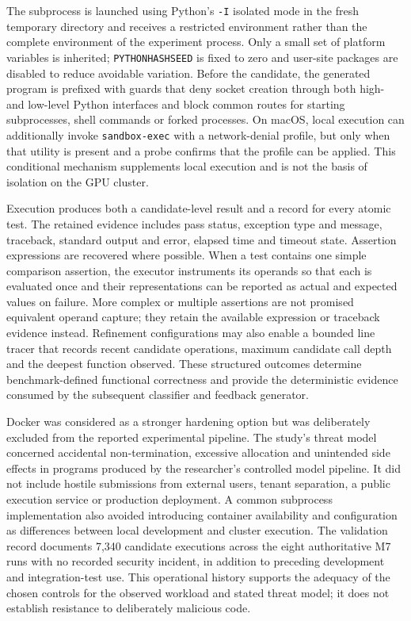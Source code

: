 The subprocess is launched using Python's \texttt{-I} isolated mode in the fresh temporary directory and receives a restricted environment rather than the complete environment of the experiment process. Only a small set of platform variables is inherited; \texttt{PYTHONHASHSEED} is fixed to zero and user-site packages are disabled to reduce avoidable variation. Before the candidate, the generated program is prefixed with guards that deny socket creation through both high- and low-level Python interfaces and block common routes for starting subprocesses, shell commands or forked processes. On macOS, local execution can additionally invoke \texttt{sandbox-exec} with a network-denial profile, but only when that utility is present and a probe confirms that the profile can be applied. This conditional mechanism supplements local execution and is not the basis of isolation on the GPU cluster.

Execution produces both a candidate-level result and a record for every atomic test. The retained evidence includes pass status, exception type and message, traceback, standard output and error, elapsed time and timeout state. Assertion expressions are recovered where possible. When a test contains one simple comparison assertion, the executor instruments its operands so that each is evaluated once and their representations can be reported as actual and expected values on failure. More complex or multiple assertions are not promised equivalent operand capture; they retain the available expression or traceback evidence instead. Refinement configurations may also enable a bounded line tracer that records recent candidate operations, maximum candidate call depth and the deepest function observed. These structured outcomes determine benchmark-defined functional correctness and provide the deterministic evidence consumed by the subsequent classifier and feedback generator.

Docker was considered as a stronger hardening option but was deliberately excluded from the reported experimental pipeline. The study's threat model concerned accidental non-termination, excessive allocation and unintended side effects in programs produced by the researcher's controlled model pipeline. It did not include hostile submissions from external users, tenant separation, a public execution service or production deployment. A common subprocess implementation also avoided introducing container availability and configuration as differences between local development and cluster execution. The validation record documents 7,340 candidate executions across the eight authoritative M7 runs with no recorded security incident, in addition to preceding development and integration-test use. This operational history supports the adequacy of the chosen controls for the observed workload and stated threat model; it does not establish resistance to deliberately malicious code.

